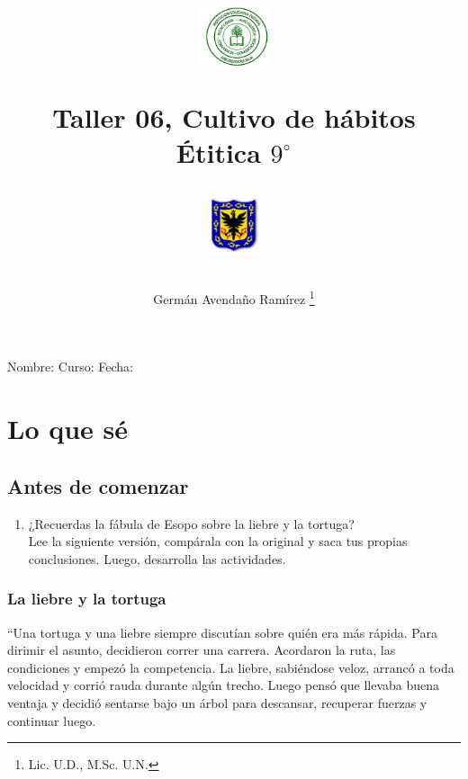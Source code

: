 \documentclass[10pt,twoside]{article}
\author{Germ\'an Avenda\~no Ram\'irez
\thanks{Lic. U.D., M.Sc. U.N.}}
\title{\begin{minipage}{.2\textwidth}
\includegraphics[height=1.75cm]{Images/logo-colegio.png}\end{minipage}
\begin{minipage}{.55\textwidth}
\begin{center}
Taller 06, Cultivo de hábitos  \\
Étitica $9^{\circ}$
\end{center}
\end{minipage}\hfill
\begin{minipage}{.2\textwidth}
\includegraphics[height=1.75cm]{Images/logo-sed.png} 
\end{minipage}}
\date{}
\begin{document}
\maketitle
Nombre: \hrulefill Curso: \underline{\hspace*{44pt}} Fecha: \underline{\hspace*{2.5cm}}
\section*{Lo que s\'{e}}
\subsection*{Antes de comenzar}
\begin{enumerate}
\item ¿Recuerdas la fábula de Esopo sobre la liebre y la tortuga?\\
Lee la siguiente versión, compárala con la original y saca tus propias conclusiones. Luego, desarrolla las actividades.
\end{enumerate}
\subsubsection*{La liebre y la tortuga}
“Una tortuga y una liebre siempre discutían sobre quién
era más rápida. Para dirimir el asunto, decidieron correr
una carrera. Acordaron la ruta, las condiciones y empezó
la competencia. La liebre, sabiéndose veloz, arrancó a toda
velocidad y corrió rauda durante algún trecho. Luego pensó
que llevaba buena ventaja y decidió sentarse bajo un árbol
para descansar, recuperar fuerzas y continuar luego.
\end{document}
